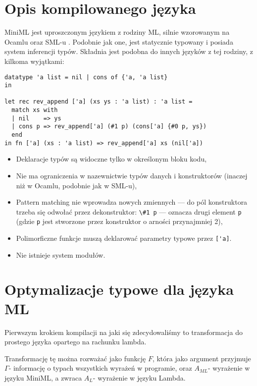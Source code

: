 \documentclass[11pt]{scrartcl}
\begin{document}
\section{Opis kompilowanego języka}
MiniML jest uproszczonym językiem z rodziny ML, silnie wzorowanym na Ocamlu
\cite{Leroy16} oraz SML-u \cite{Appel1}.
Podobnie jak one, jest statycznie typowany i posiada system inferencji typów.
Składnia jest podobna do innych języków z tej rodziny, z kilkoma wyjątkami:
\begin{lstlisting}[caption=Przykład deklaracji typu danych w MiniML]
datatype 'a list = nil | cons of {'a, 'a list}
in

let rec rev_append ['a] (xs ys : 'a list) : 'a list =
  match xs with
  | nil    => ys
  | cons p => rev_append['a] (#1 p) (cons['a] {#0 p, ys})
  end
in fn ['a] (xs : 'a list) => rev_append['a] xs (nil['a])
\end{lstlisting}
\begin{itemize}
\item Deklaracje typów są widoczne tylko w określonym bloku kodu,
\item Nie ma ograniczenia w nazewnictwie typów danych i konstruktorów
  (inaczej niż w Ocamlu, podobnie jak w SML-u),
\item Pattern matching nie wprowadza nowych zmiennych --- do pól konstruktora
  trzeba się odwołać przez dekonstruktor: \lstinline|\#1 p| --- oznacza drugi element \lstinline|p|
  (gdzie \lstinline|p| jest stworzone przez konstruktor o arności przynajmniej 2),
\item Polimorficzne funkcje muszą deklarować parametry typowe przez \lstinline|['a]|.
\item Nie istnieje system modułów.
\end{itemize}



\section{Optymalizacje typowe dla języka ML}
Pierwszym krokiem kompilacji na jaki się zdecydowaliśmy to transformacja do
prostego języka opartego na rachunku lambda.

Transformację tę można rozważać jako funkcję $F$, która jako argument przyjmuje
$\Gamma$- informację o typach wszystkich wyrażeń w programie, oraz $A_{ML}$-
wyrażenie w języku MiniML, a zwraca $A_L$- wyrażenie w języku Lambda.
\end{document}
